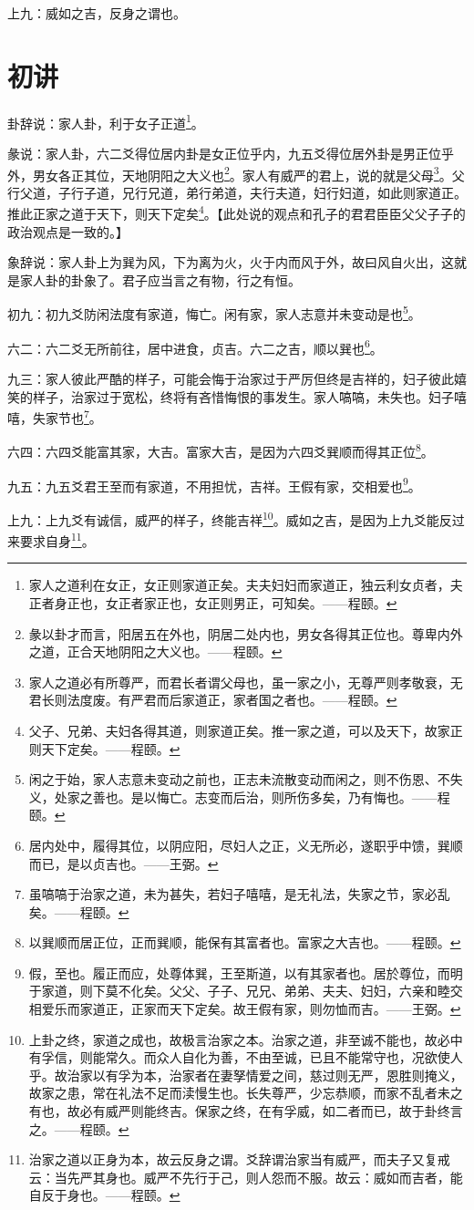 \documentclass[12pt,oneside]{book}
\begin{document}
上九：威如之吉，反身之谓也。

\section{初讲}
卦辞说：家人卦，利于女子正道\footnote{家人之道利在女正，女正则家道正矣。夫夫妇妇而家道正，独云利女贞者，夫正者身正也，女正者家正也，女正则男正，可知矣。——程颐。}。

彖说：家人卦，六二爻得位居内卦是女正位乎内，九五爻得位居外卦是男正位乎外，男女各正其位，天地阴阳之大义也\footnote{彖以卦才而言，阳居五在外也，阴居二处内也，男女各得其正位也。尊卑内外之道，正合天地阴阳之大义也。——程颐。}。家人有威严的君上，说的就是父母\footnote{家人之道必有所尊严，而君长者谓父母也，虽一家之小，无尊严则孝敬衰，无君长则法度废。有严君而后家道正，家者国之者也。——程颐。}。父行父道，子行子道，兄行兄道，弟行弟道，夫行夫道，妇行妇道，如此则家道正。推此正家之道于天下，则天下定矣\footnote{父子、兄弟、夫妇各得其道，则家道正矣。推一家之道，可以及天下，故家正则天下定矣。——程颐。}。【此处说的观点和孔子的君君臣臣父父子子的政治观点是一致的。】

象辞说：家人卦上为巽为风，下为离为火，火于内而风于外，故曰风自火出，这就是家人卦的卦象了。君子应当言之有物，行之有恒。


初九：初九爻防闲法度有家道，悔亡。闲有家，家人志意并未变动是也\footnote{闲之于始，家人志意未变动之前也，正志未流散变动而闲之，则不伤恩、不失义，处家之善也。是以悔亡。志变而后治，则所伤多矣，乃有悔也。——程颐。}。

六二：六二爻无所前往，居中进食，贞吉。六二之吉，顺以巽也\footnote{居内处中，履得其位，以阴应阳，尽妇人之正，义无所必，遂职乎中馈，巽顺而已，是以贞吉也。——王弼。}。

九三：家人彼此严酷的样子，可能会悔于治家过于严厉但终是吉祥的，妇子彼此嬉笑的样子，治家过于宽松，终将有吝惜悔恨的事发生。家人嗃嗃，未失也。妇子嘻嘻，失家节也\footnote{虽嗃嗃于治家之道，未为甚失，若妇子嘻嘻，是无礼法，失家之节，家必乱矣。——程颐。}。

六四：六四爻能富其家，大吉。富家大吉，是因为六四爻巽顺而得其正位\footnote{以巽顺而居正位，正而巽顺，能保有其富者也。富家之大吉也。——程颐。}。

九五：九五爻君王至而有家道，不用担忧，吉祥。王假有家，交相爱也\footnote{假，至也。履正而应，处尊体巽，王至斯道，以有其家者也。居於尊位，而明于家道，则下莫不化矣。父父、子子、兄兄、弟弟、夫夫、妇妇，六亲和睦交相爱乐而家道正，正家而天下定矣。故王假有家，则勿恤而吉。——王弼。}。

上九：上九爻有诚信，威严的样子，终能吉祥\footnote{上卦之终，家道之成也，故极言治家之本。治家之道，非至诚不能也，故必中有孚信，则能常久。而众人自化为善，不由至诚，已且不能常守也，况欲使人乎。故治家以有孚为本，治家者在妻孥情爱之间，慈过则无严，恩胜则掩义，故家之患，常在礼法不足而渎慢生也。长失尊严，少忘恭顺，而家不乱者未之有也，故必有威严则能终吉。保家之终，在有孚威，如二者而已，故于卦终言之。——程颐。}。威如之吉，是因为上九爻能反过来要求自身\footnote{治家之道以正身为本，故云反身之谓。爻辞谓治家当有威严，而夫子又复戒云：当先严其身也。威严不先行于己，则人怨而不服。故云：威如而吉者，能自反于身也。——程颐。}。
\end{document}
